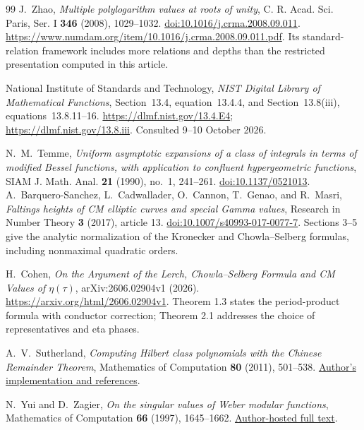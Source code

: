 \begin{thebibliography}{99}
J.~Zhao,
\emph{Multiple polylogarithm values at roots of unity},
C. R. Acad. Sci. Paris, Ser. I \textbf{346} (2008), 1029--1032.
\href{https://doi.org/10.1016/j.crma.2008.09.011}
{doi:10.1016/j.crma.2008.09.011}.
\url{https://www.numdam.org/item/10.1016/j.crma.2008.09.011.pdf}.
Its standard-relation framework includes more relations and depths
than the restricted presentation computed in this article.

National Institute of Standards and Technology,
\emph{NIST Digital Library of Mathematical Functions},
Section~13.4, equation~13.4.4, and Section~13.8(iii),
equations~13.8.11--16.
\url{https://dlmf.nist.gov/13.4.E4};
\url{https://dlmf.nist.gov/13.8.iii}.
Consulted 9--10 October 2026.

N.~M.~Temme,
\emph{Uniform asymptotic expansions of a class of integrals in terms of
modified Bessel functions, with application to confluent hypergeometric
functions},
SIAM J. Math. Anal. \textbf{21} (1990), no.~1, 241--261.
\href{https://doi.org/10.1137/0521013}{doi:10.1137/0521013}.
A.~Barquero-Sanchez, L.~Cadwallader, O.~Cannon, T.~Genao, and R.~Masri,
\emph{Faltings heights of CM elliptic curves and special Gamma values},
Research in Number Theory \textbf{3} (2017), article 13.
\href{https://doi.org/10.1007/s40993-017-0077-7}{doi:10.1007/s40993-017-0077-7}.
Sections 3--5 give the analytic normalization of the Kronecker and
Chowla--Selberg formulas, including nonmaximal quadratic orders.

H.~Cohen, \emph{On the Argument of the Lerch, Chowla--Selberg Formula
and CM Values of $\eta(\tau)$}, arXiv:2606.02904v1 (2026).
\url{https://arxiv.org/html/2606.02904v1}.
Theorem 1.3 states the period-product formula with conductor correction;
Theorem 2.1 addresses the choice of representatives and eta phases.

A.~V.~Sutherland, \emph{Computing Hilbert class polynomials with the
Chinese Remainder Theorem}, Mathematics of Computation \textbf{80}
(2011), 501--538.
\href{https://math.mit.edu/~drew/classpoly.html}{Author's implementation and references}.

N.~Yui and D.~Zagier, \emph{On the singular values of Weber modular
functions}, Mathematics of Computation \textbf{66} (1997), 1645--1662.
\href{https://people.mpim-bonn.mpg.de/zagier/files/doi/10.1090/S0025-5718-97-00854-5/fulltext.pdf}{Author-hosted full text}.


\end{thebibliography}
